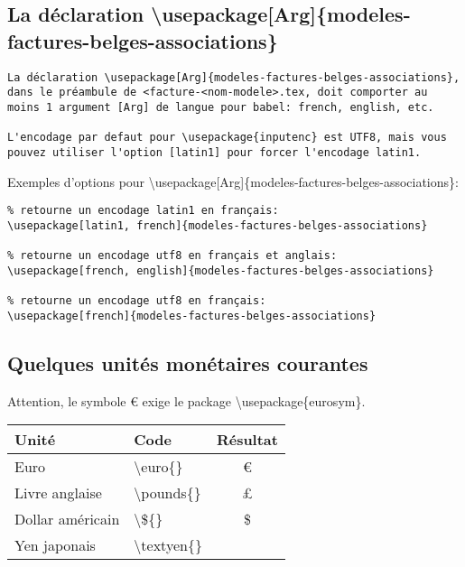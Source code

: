 \documentclass[a4paper,10pt]{article}
\begin{document}
\subsection{La déclaration \textbackslash usepackage[Arg]\{modeles-factures-belges-associations\}}

\begin{lstlisting}
La déclaration \usepackage[Arg]{modeles-factures-belges-associations}, dans le préambule de <facture-<nom-modele>.tex, doit comporter au moins 1 argument [Arg] de langue pour babel: french, english, etc.  

L'encodage par defaut pour \usepackage{inputenc} est UTF8, mais vous pouvez utiliser l'option [latin1] pour forcer l'encodage latin1.
\end{lstlisting}


\noindent
Exemples d'options pour \textbackslash usepackage[Arg]\{modeles-factures-belges-associations\}:

\begin{lstlisting}
% retourne un encodage latin1 en français:
\usepackage[latin1, french]{modeles-factures-belges-associations} 

% retourne un encodage utf8 en français et anglais:
\usepackage[french, english]{modeles-factures-belges-associations}

% retourne un encodage utf8 en français:    
\usepackage[french]{modeles-factures-belges-associations} 
\end{lstlisting}

\subsection{Quelques unités monétaires courantes}%
\label{sub:unites_monetaire_courantes}

Attention, le symbole \euro{} exige le package \textbackslash usepackage\{eurosym\}.%

\begin{center}%
\begin{tabular}{|l|l|c|}%
\hline%
\rowcolor{grisclair} \textbf{Unité} & \textbf{Code} & \textbf{Résultat} \\%
\hline%
Euro &  \textbackslash euro\{\} & \euro{} \\%
\hline%
Livre anglaise & \textbackslash pounds\{\} & \pounds{} \\%
\hline%
Dollar américain & \textbackslash \$\{\} & \${} \\%
\hline%
Yen japonais & \textbackslash textyen\{\} & \textyen{} \\%
\hline%
\end{tabular}%
\end{center}%
\end{document}

